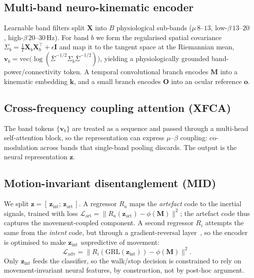 \documentclass[journal]{IEEEtran}
\begin{document}
\subsection{Multi-band neuro-kinematic encoder}
Learnable band filters split $\mathbf{X}$ into $B$ physiological sub-bands
($\mu\,8$--$13$, low-$\beta\,13$--$20$, high-$\beta\,20$--$30$\,Hz). For band $b$ we
form the regularised spatial covariance
$\Sigma_b = \tfrac{1}{T}\mathbf{X}_b\mathbf{X}_b^{\!\top} + \epsilon\mathbf{I}$ and map
it to the tangent space at the Riemannian mean,
$\mathbf{v}_b=\mathrm{vec}\!\big(\log(\bar\Sigma^{-1/2}\Sigma_b\bar\Sigma^{-1/2})\big)$,
yielding a physiologically grounded band-power/connectivity token. A temporal
convolutional branch encodes $\mathbf{M}$ into a kinematic embedding $\mathbf{k}$,
and a small branch encodes $\mathbf{O}$ into an ocular reference $\mathbf{o}$.

\subsection{Cross-frequency coupling attention (XFCA)}
The band tokens $\{\mathbf{v}_b\}$ are treated as a sequence and passed through a
multi-head self-attention block, so the representation can express $\mu$--$\beta$
coupling: co-modulation across bands that single-band pooling discards. The output
is the neural representation $\mathbf{z}$.

\subsection{Motion-invariant disentanglement (MID)}
We split $\mathbf{z}=[\,\mathbf{z}_{\mathrm{int}};\,\mathbf{z}_{\mathrm{art}}\,]$. A
regressor $R_a$ maps the \emph{artefact} code to the inertial signals, trained with
loss $\mathcal{L}_{\mathrm{art}}=\lVert R_a(\mathbf{z}_{\mathrm{art}})-\phi(\mathbf{M})\rVert^2$;
the artefact code thus captures the movement-coupled component. A second regressor
$R_i$ attempts the same from the \emph{intent} code, but through a gradient-reversal
layer~\cite{ganin2016}, so the encoder is optimised to make $\mathbf{z}_{\mathrm{int}}$
\emph{un}predictive of movement:
\begin{equation}
\mathcal{L}_{\mathrm{adv}}=\lVert R_i(\mathrm{GRL}(\mathbf{z}_{\mathrm{int}}))-\phi(\mathbf{M})\rVert^2 .
\end{equation}
Only $\mathbf{z}_{\mathrm{int}}$ feeds the classifier, so the walk/stop decision is
constrained to rely on movement-invariant neural features, by construction, not by
post-hoc argument.
\end{document}
